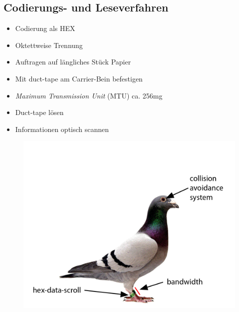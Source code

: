 \documentclass{beamer}
\begin{document}
	\subsection{Codierungs- und Leseverfahren}
	\begin{frame}
		\begin{itemize}
			\item Codierung als HEX
			\item Oktettweise Trennung
			\item Auftragen auf längliches Stück Papier
			\item Mit duct-tape am Carrier-Bein befestigen
			\item \textit{Maximum Transmission Unit} (MTU) ca. 256\pause  mg
		\end{itemize}
	\end{frame}
	\begin{frame}
		\begin{itemize}
			\item Duct-tape lösen
			\item Informationen optisch scannen
		\end{itemize}
	\end{frame}
	\begin{frame}
		\begin{figure}[ht]	
			\vspace{-1.5cm}\includegraphics[height= \textheight]{./images/carrier-pic}
		\end{figure}
	\end{frame}
\end{document}
